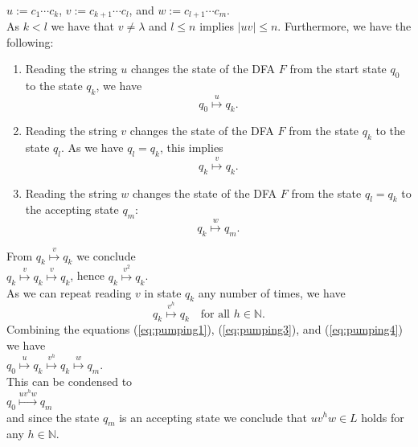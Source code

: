 \\[0.2cm]
\hspace*{1.3cm}
$u := c_1 \cdots c_k$, \quad $v := c_{k+1} \cdots c_l$, \quad and \quad $w := c_{l+1} \cdots c_{m}$.
\\[0.2cm]
As $k < l$ we have that $v \not= \lambda$ and $l \leq n$ implies $|uv| \leq n$.
Furthermore, we have the following:
\begin{enumerate}
\item Reading the string $u$ changes the state of the \textsc{DFA} $F$ from the start state $q_0$ to
      the state $q_k$, we have
      \begin{equation}
        \label{eq:pumping1}
        q_0 \stackrel{u}{\longmapsto} q_k.    
      \end{equation}
\item Reading the string $v$ changes the state of the \textsc{DFA} $F$ from the state $q_k$ to the
      state $q_l$.  As we have $q_l = q_k$, this implies
      \begin{equation}
        \label{eq:pumping2}
      q_k \stackrel{v}{\longmapsto} q_k.        
      \end{equation}
\item Reading the string $w$ changes the state of the \textsc{DFA} $F$ from the state  $q_l = q_k$
      to the accepting state $q_m$:
      \begin{equation}
        \label{eq:pumping3}
        q_k \stackrel{w}{\longmapsto} q_m.        
      \end{equation}
\end{enumerate}
From $q_k \stackrel{v}{\longmapsto} q_k$ we conclude
\\[0.2cm]
\hspace*{1.3cm}
$q_k \stackrel{v}{\longmapsto} q_k \stackrel{v}{\longmapsto} q_k$, \quad hence \quad $q_k \stackrel{v^2}{\longmapsto} q_k$.
\\[0.2cm]
As we can repeat reading $v$ in state $q_k$ any number of times, we have
\begin{equation}
  \label{eq:pumping4}
  q_k \stackrel{v^h}{\longmapsto} q_k  \quad \mbox{for all $h \in \mathbb{N}$.}
\end{equation}
Combining the equations (\ref{eq:pumping1}), (\ref{eq:pumping3}), and (\ref{eq:pumping4})  we have
\\[0.2cm]
\hspace*{1.3cm}
$q_0 \stackrel{u}{\longmapsto} q_k \stackrel{v^h}{\longmapsto} q_k \stackrel{w}{\longmapsto} q_m$.
\\[0.2cm]
This can be condensed to
\\[0.2cm]
\hspace*{1.3cm}
$q_0 \stackrel{uv^hw}{\longmapsto} q_m$
\\[0.2cm]
and since the state $q_m$ is an accepting state we conclude that $uv^hw \in L$ holds for any $h \in
\mathbb{N}$.

